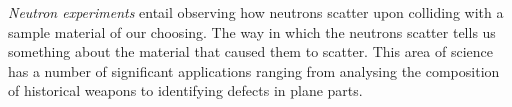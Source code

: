 \textit{Neutron experiments} entail observing how neutrons scatter upon colliding with a sample material of our choosing. The way in which the neutrons scatter tells us something about the material that caused them to scatter. This area of science has a number of significant applications ranging from analysing the composition of historical weapons to identifying defects in plane parts.
